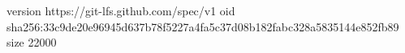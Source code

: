 version https://git-lfs.github.com/spec/v1
oid sha256:33c9de20e96945d637b78f5227a4fa5c37d08b182fabc328a5835144e852fb89
size 22000

